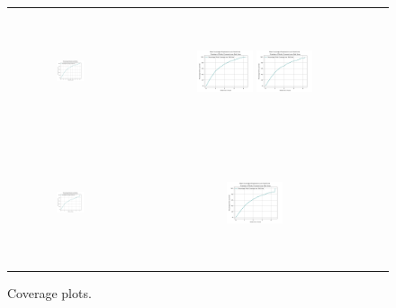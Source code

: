 \begin{figure}[H]
    \centering
    \begin{tabular}{ccc} 
         \includegraphics[height=36mm,width=0.24\textwidth]{Images/simulation_obs/coverage_plots/1.png}
        & \includegraphics[height=36mm,width=0.24\textwidth]{Images/simulation_obs/coverage_plots/2.png}
         \includegraphics[height=36mm,width=0.24\textwidth]{Images/simulation_obs/coverage_plots/3.png}\\[-4pt]

        \includegraphics[height=36mm,width=0.24\textwidth]{Images/simulation_obs/coverage_plots/4.png}
        & \includegraphics[height=36mm,width=0.24\textwidth]{Images/simulation_obs/coverage_plots/5.png} 

    \end{tabular}
    \caption{Coverage plots.\label{fig:coverage_plots_obs}} 
\end{figure}


